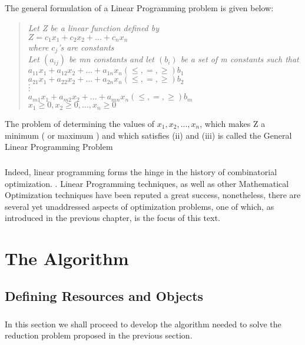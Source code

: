 \documentclass[a4paper,openany]{book}
\begin{document}
		\paragraph{}
			The general formulation of a Linear Programming problem is given below:
			\begin{verse}
				\begin{center}
					\textit{
						Let Z be a linear function defined by \\
						$Z = c_1x_1 + c_2x_2+...+c_nx_n$ \\
						where $c_j$'s are constants \\
						Let $(a_{ij})$ be mn constants and let $(b_i)$ be a set of m constants such that \\
						$a_{11}x_1+a_{12}x_2+...+a_{1n}x_n (\leq,=,\geq) b_1$ \\
						$a_{21}x_1+a_{22}x_2+...+a_{2n}x_n (\leq,=,\geq) b_2$ \\
						$\cdot$ \\
						$\cdot$ \\
						$\cdot$ \\
						$a_{m1}x_1+a_{m2}x_2+...+a_{mn}x_n (\leq,=,\geq) b_m$ \\
						$x_1\geq0,x_2\geq0,...,x_n\geq0$ \\
					} \cite{stats}
				\end{center}
			\end{verse}
			The problem of determining the values of $x_1, x_2,...,x_n$, which makes Z a minimum ( or maximum ) and which satisfies (ii) and (iii) is called the General Linear Programming Problem    
		\paragraph{}
		Indeed, linear programming forms the hinge in the history of combinatorial optimization. \cite{schrijver}. Linear Programming techniques, as well as other Mathematical Optimization techniques have been reputed a great success, nonetheless, there are several yet unaddressed aspects of optimization problems, one of which, as introduced in the previous chapter, is the focus of this text.
	\chapter{The Algorithm}
		\section{Defining Resources and Objects}
			\paragraph{}
				In this section we shall proceed to develop the algorithm needed to solve the reduction problem proposed in the previous section.
\end{document}
